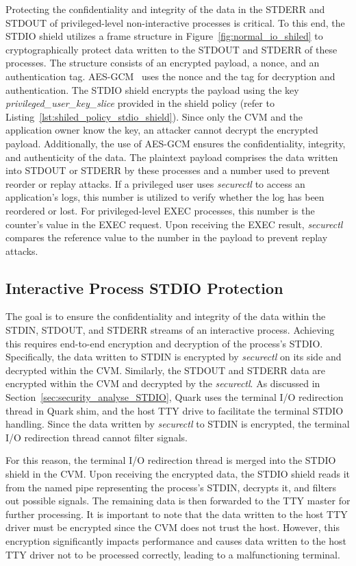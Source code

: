 Protecting the confidentiality and integrity of the data in the STDERR and STDOUT of privileged-level non-interactive processes is critical. To this end, the STDIO shield utilizes a frame structure in Figure~\ref{fig:normal_io_shiled} to cryptographically protect data written to the STDOUT and STDERR of these processes. The structure consists of an 
encrypted payload, a nonce, and an authentication tag. AES-GCM~\cite*{aes_gcm} uses the nonce and the tag for decryption and authentication. The STDIO shield encrypts the payload using the key \emph{privileged\_user\_key\_slice} provided in the shield policy (refer to Listing~\ref{lst:shiled_policy_stdio_shield}). Since only the \acrshort{CVM} and the application owner know 
the key, an attacker cannot decrypt the encrypted payload. Additionally, the use of AES-GCM ensures the confidentiality, integrity, and authenticity of the data. The plaintext payload comprises the data written into STDOUT or STDERR by these processes and a number used to prevent reorder or replay attacks. If a privileged user uses \emph{securectl} to 
access an application’s logs, this number is utilized to verify whether the log has been reordered or lost. For privileged-level EXEC processes, this number is the counter’s value in the EXEC request. Upon receiving the EXEC result, \emph{securectl} compares the reference value to the number in the payload to prevent replay attacks.


\subsection{Interactive Process STDIO Protection}
\label{subsec:design_terminal}


The goal is to ensure the confidentiality and integrity of the data within the STDIN, STDOUT, and STDERR streams of an interactive process. Achieving this requires end-to-end encryption and decryption of the process's STDIO. Specifically, the data written to STDIN is encrypted by \emph{securectl} on its side and decrypted within the \acrshort{CVM}. Similarly, 
the STDOUT and STDERR data are encrypted within the \acrshort{CVM} and decrypted by the \emph{securectl}. As discussed in Section~\ref{sec:security_analyse_STDIO}, Quark uses the terminal I/O redirection thread in Quark shim, and the host TTY drive to facilitate the terminal STDIO handling. Since the data written by \emph{securectl} to STDIN is encrypted, the 
terminal I/O redirection thread cannot filter signals.

For this reason, the terminal I/O redirection thread is merged into the STDIO shield in the \acrshort{CVM}. Upon receiving the encrypted data, the STDIO shield reads it from the named pipe representing the process's STDIN, decrypts it, and filters out possible signals. The remaining data is then forwarded to the TTY master for further processing. It is important 
to note that the data written to the host TTY driver must be encrypted since the \acrshort{CVM} does not trust the host. However, this encryption significantly impacts performance and causes data written to the host TTY driver not to be processed correctly, leading to a malfunctioning terminal.

